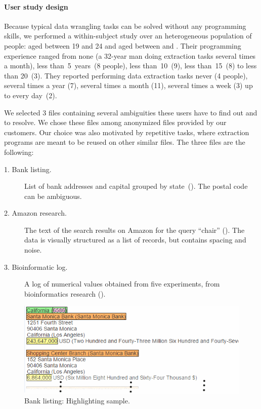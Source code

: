 \paragraph{User study design}
Because typical data wrangling tasks can be solved without any programming skills, we performed a
within-subject study over an heterogeneous population of \numPeopleSurvey{} people: 
aged between 19 and 24 and  aged between \minAge{} and \maxAge{}.
Their programming experience ranged from none (a 32-year man doing extraction tasks several
times a month), less than~5~years~(8 people), less than~10~(9), less than~15~(8) to less than 20~(3).
They reported performing data extraction tasks never (4 people), several times a year (7),
several times a month (11), several times a week (3) up to every day~(2).

We selected 3 files containing several ambiguities these users have to find out and to resolve.
We chose these files among anonymized files provided by our customers.
Our choice was also motivated by repetitive tasks, where extraction programs are meant to be
reused on other similar files.
The three files are the following:

\newcommand{\BankListing}{Bank listing}
\newcommand{\AmazonListing}{Amazon research}
\newcommand{\HydrogensListing}{Bioinformatic log}
\begin{description}
    \item[1. \BankListing.] List of bank addresses and capital grouped by
        state~().
        The postal code can be ambiguous.
    \item[2. Amazon research.] The text of the search results on Amazon for the query
        ``chair'' ().
        The data is visually structured as a list of records, but contains spacing and noise.
    \item[3. Bioinformatic log.] A log of numerical values obtained from five experiments, from bioinformatics
        research ().
\end{description}

\begin{figure}[t]
    \centering
    \includegraphics[width=0.8\columnwidth]{figures/bankinfo2}
    \caption{\BankListing: Highlighting sample.}
    \label{fig:interactive:evaluation:banksample}
\end{figure}

